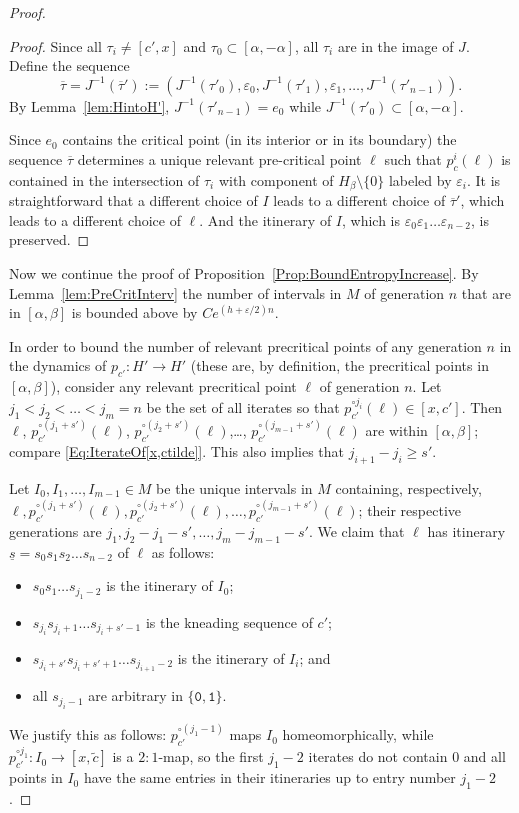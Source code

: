 \documentclass[12pt]{amsart}
\newcommand{\0}{\texttt{0}}
\newcommand{\1}{\texttt{1}}
\newcommand{\s}{\underline{s}}
\newcommand\eps{\varepsilon}
\theoremstyle{definition}
\numberwithin{equation}{section}
\newcommand{\ovl}[1]{\overline{#1}}
\begin{document}
\begin{proof}
\begin{proof}
 Since all $\tau_i\neq [c',x]$ and  $\tau_0\subset [\alpha,-\alpha]$, all $\tau_i$ are in the image of $J$. Define the sequence 
\[
\ovl \tau=J^{-1}(\ovl \tau'):= (J^{-1}(\tau'_0), \eps_0, J^{-1}(\tau'_1), \eps_1,\dots , J^{-1}(\tau'_{n-1})).
\] 
By Lemma~\ref{lem:HintoH'}, $ J^{-1}(\tau'_{n-1})=e_0$ while $J^{-1}(\tau'_0)\subset [\alpha,-\alpha]$.
 
 Since $e_0$ contains the critical point (in its interior or in its boundary) the sequence $\ovl \tau$ determines a unique relevant pre-critical point $\ell$ such that $p_c^{i}(\ell)$ is contained in the intersection of $\tau_i$ with component of $H_\beta\setminus \{0\}$ labeled by $\eps_i$. It is straightforward that a different choice of $I$ leads to a different choice of $\ovl \tau'$, which leads to a different choice of $\ell$. And the itinerary of $I$, which is $\eps_0\eps_1\dots \eps_{n-2}$, is preserved.
\end{proof}





{Now we continue the proof of Proposition~\ref{Prop:BoundEntropyIncrease}}.
By Lemma~\ref{lem:PreCritInterv} the number of intervals in $M$ of generation $n$ that are in $[\alpha,\beta]$ is bounded above by $Ce^{(h+\eps/2)n}$.

In order to bound the number of relevant precritical points of any generation $n$ in the dynamics of $p_{c'}\colon H'\to H'$ (these are, by definition, the precritical points in $[\alpha,\beta]$), consider any relevant precritical point $\ell$ of generation $n$. 
Let $j_1<j_2<\dots <j_m=n$ be the set of all iterates so that $p_{c'}^{\circ j_i}(\ell)\in [x,c']$.
Then  $\ell$, $p_{c'}^{\circ (j_1+s')}(\ell)$, $p_{c'}^{\circ(j_2+s')}(\ell)$,\dots , $p_{c'}^{\circ(j_{m-1}+s')}(\ell)$ are within $[\alpha,\beta]$; compare \eqref{Eq:IterateOf[x,ctilde]}. This also implies that $j_{i+1}-j_i\ge s'$. 

Let $I_0,I_1,\dots , I_{m-1}\in M$ be the unique intervals in $M$ containing, respectively, 
$\ell, p_{c'}^{\circ(j_1+s')}(\ell),p_{c'}^{\circ(j_2+s')}(\ell),\dots , p_{c'}^{\circ(j_{m-1}+s')}(\ell)$; their respective generations are $j_1, j_2-j_1-s',\dots , j_{m}-j_{m-1}-s'$. 
We claim that $\ell$ has itinerary  $\s=s_0s_1s_2\dots s_{n-2}$ of $\ell$ as follows:
\begin{itemize}
\item $s_0s_1\dots s_{j_1-2}$ is the itinerary of $I_0$;
\item $s_{j_i}s_{j_i+1}\dots s_{j_i+s'-1}$ is the kneading sequence of $c'$; 
\item $s_{j_{i}+s'}s_{j_{i}+s'+1}\dots s_{j_{i+1}-2}$ is the itinerary of $I_i$; and
\item all $s_{j_{i}-1}$ are arbitrary in $\{\0,\1\}$.
\end{itemize} 
We justify this as follows: 
$p_{c'}^{\circ(j_1-1)} $ maps $I_0$ homeomorphically, while  $p_{c'}^{\circ j_1}\colon I_0\to [x,\tilde c]$ is a $2:1$-map, so the first $j_1-2$ iterates do not contain $0$ and all points in $I_0$ have the same entries in their itineraries up to entry number $j_1-2$. 


\end{proof}
\end{document}
